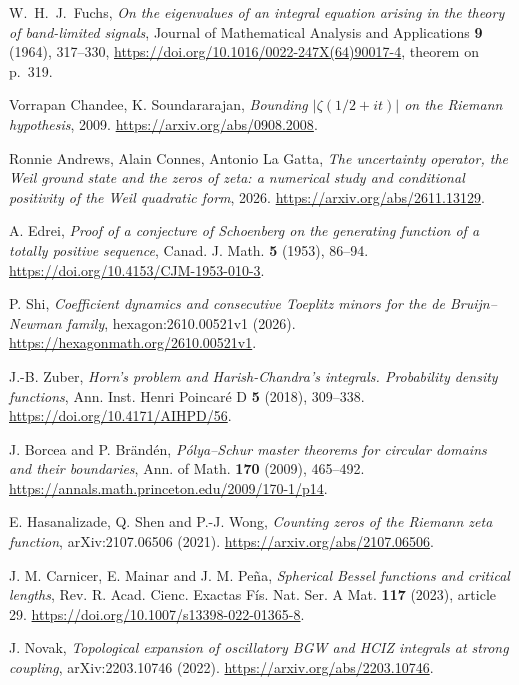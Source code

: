  W.~H.~J.~Fuchs, \emph{On the eigenvalues of an integral equation arising in the theory of band-limited signals}, Journal of Mathematical Analysis and Applications \textbf{9} (1964), 317--330, \url{https://doi.org/10.1016/0022-247X(64)90017-4}, theorem on p.~319.

 Vorrapan Chandee, K. Soundararajan, \emph{Bounding {$|\zeta(1/2+it)|$} on the {Riemann} hypothesis}, 2009. \url{https://arxiv.org/abs/0908.2008}.


 Ronnie Andrews, Alain Connes, Antonio La Gatta, \emph{The uncertainty operator, the {Weil} ground state and the zeros of zeta:  a numerical study and conditional positivity of the {Weil} quadratic form}, 2026. \url{https://arxiv.org/abs/2611.13129}.

 A. Edrei, \emph{Proof of a conjecture of Schoenberg on the generating function of a totally positive sequence},
Canad. J. Math. \textbf{5} (1953), 86--94.
\url{https://doi.org/10.4153/CJM-1953-010-3}.

 P. Shi, \emph{Coefficient dynamics and consecutive Toeplitz minors for the de Bruijn--Newman family},
hexagon:2610.00521v1 (2026).
\url{https://hexagonmath.org/2610.00521v1}.

 J.-B. Zuber, \emph{Horn's problem and Harish-Chandra's integrals. Probability density functions},
Ann. Inst. Henri Poincar\'e D \textbf{5} (2018), 309--338.
\url{https://doi.org/10.4171/AIHPD/56}.

 J. Borcea and P. Br\"and\'en, \emph{P\'olya--Schur master theorems for circular domains and their boundaries},
Ann. of Math. \textbf{170} (2009), 465--492.
\url{https://annals.math.princeton.edu/2009/170-1/p14}.

 E. Hasanalizade, Q. Shen and P.-J. Wong, \emph{Counting zeros of the Riemann zeta function},
arXiv:2107.06506 (2021).
\url{https://arxiv.org/abs/2107.06506}.

 J. M. Carnicer, E. Mainar and J. M. Pe\~na,
\emph{Spherical Bessel functions and critical lengths},
Rev. R. Acad. Cienc. Exactas F\'is. Nat. Ser. A Mat. \textbf{117} (2023), article 29.
\url{https://doi.org/10.1007/s13398-022-01365-8}.

 J. Novak, \emph{Topological expansion of oscillatory BGW and HCIZ integrals at strong coupling},
arXiv:2203.10746 (2022).
\url{https://arxiv.org/abs/2203.10746}.

